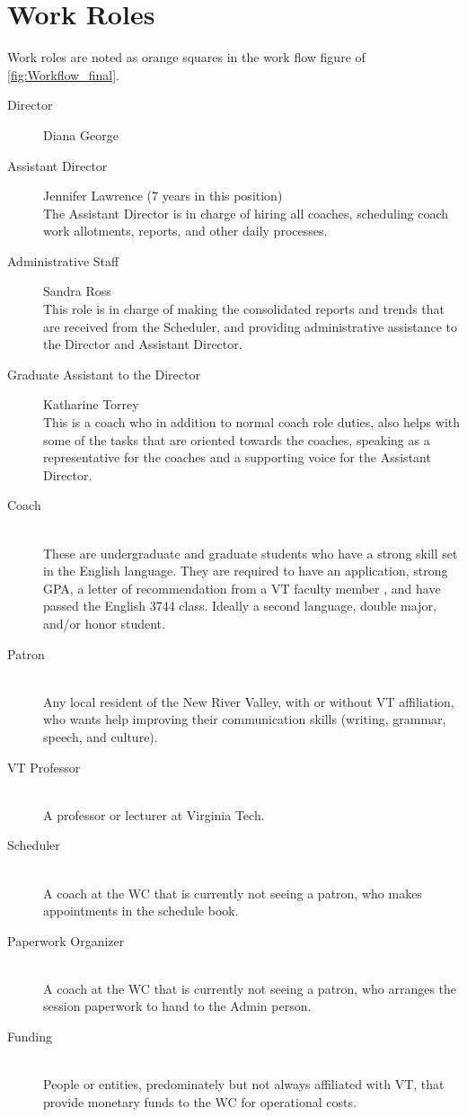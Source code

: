 \documentclass[12pt]{article} %
\begin{document}
\section{Work Roles} %
  Work roles are noted as orange squares in the work flow figure of \ref{fig:Workflow_final}.
  \begin{description} %
  \item[Director]
  Diana George
  \item[Assistant Director]
  Jennifer Lawrence (7 years in this position)\\
  The Assistant Director is in charge of hiring all coaches, scheduling coach work allotments, reports, and other daily processes.
  \item[Administrative Staff]
  Sandra Ross \\
  This role is in charge of making the consolidated reports and trends that are received from the Scheduler, and providing administrative assistance to the Director and Assistant Director. 
  \item[Graduate Assistant to the Director]
  Katharine Torrey \\
  This is a coach who in addition to normal coach role duties, also helps with some of the tasks that are oriented towards the coaches, speaking as a representative for the coaches and a supporting voice for the Assistant Director.
  \item[Coach] \hfill \\
  These are undergraduate and graduate students who have a strong skill set in the English language.
  They are required to have an application, strong GPA, a letter of recommendation from a VT faculty member , and have passed the English 3744 class.
  Ideally a second language, double major, and/or honor student.
  \item[Patron] \hfill \\
  Any local resident of the New River Valley, with or without VT affiliation, who wants help improving their communication skills (writing, grammar, speech, and culture).
  \item[VT Professor] \hfill \\
  A professor or lecturer at Virginia Tech.
  \item[Scheduler] \hfill \\
  A coach at the WC that is currently not seeing a patron, who makes appointments in the schedule book.
  \item[Paperwork Organizer] \hfill \\
  A coach at the WC that is currently not seeing a patron, who arranges the session paperwork to hand to the Admin person.
  \item[Funding] \hfill \\
  People or entities, predominately but not always affiliated with VT, that provide monetary funds to the WC for operational costs.
  \end{description} 
\end{document}
